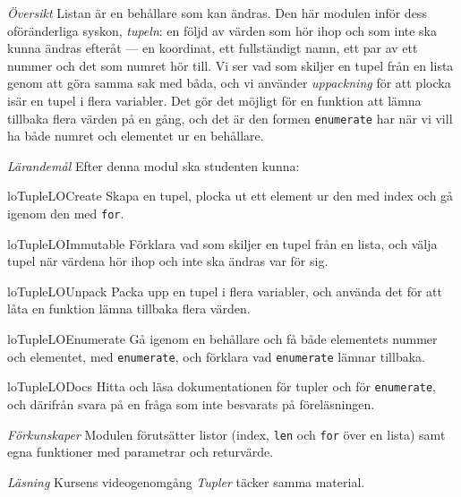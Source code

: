 \emph{Översikt}
Listan är en behållare som kan ändras.  Den här modulen inför dess
oföränderliga syskon, \emph{tupeln}: en följd av värden som hör ihop och
som inte ska kunna ändras efteråt --- en koordinat, ett fullständigt
namn, ett par av ett nummer och det som numret hör till.  Vi ser vad som
skiljer en tupel från en lista genom att göra samma sak med båda, och vi
använder \emph{uppackning} för att plocka isär en tupel i flera
variabler.  Det gör det möjligt för en funktion att lämna tillbaka flera
värden på en gång, och det är den formen
\texttt{enumerate} har när vi vill ha både numret och
elementet ur en behållare.

\emph{Lärandemål}
Efter denna modul ska studenten kunna:
\begin{restatable}{lo}{TupleLOCreate}\label{TupleLOCreate}%
  Skapa en tupel, plocka ut ett element ur den med index och gå igenom
  den med \texttt{for}.
\end{restatable}%
\begin{restatable}{lo}{TupleLOImmutable}\label{TupleLOImmutable}%
  Förklara vad som skiljer en tupel från en lista, och välja tupel när
  värdena hör ihop och inte ska ändras var för sig.
\end{restatable}%
\begin{restatable}{lo}{TupleLOUnpack}\label{TupleLOUnpack}%
  Packa upp en tupel i flera variabler, och använda det för att låta en
  funktion lämna tillbaka flera värden.
\end{restatable}%
\begin{restatable}{lo}{TupleLOEnumerate}\label{TupleLOEnumerate}%
  Gå igenom en behållare och få både elementets nummer och elementet,
  med \texttt{enumerate}, och förklara vad
  \texttt{enumerate} lämnar tillbaka.
\end{restatable}%
\begin{restatable}{lo}{TupleLODocs}\label{TupleLODocs}%
  Hitta och läsa dokumentationen för tupler och för
  \texttt{enumerate}, och därifrån svara på en fråga som
  inte besvarats på föreläsningen.
\end{restatable}%

\emph{Förkunskaper}
Modulen förutsätter listor (index, \texttt{len} och
\texttt{for} över en lista) samt egna funktioner med
parametrar och returvärde.

\emph{Läsning}
Kursens videogenomgång \emph{Tupler} täcker samma material.
